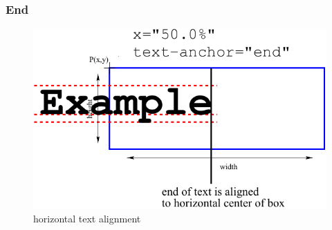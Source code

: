 \clearpage

\subsubsection{End}

\begin{figure}[h!]
\begin{center}
\includegraphics[scale=0.60]{figures/HorizontalTextPlacement_End}
\end{center}
\caption{horizontal text alignment }
\label{HorizontalTextPlacement_End}
\end{figure}

